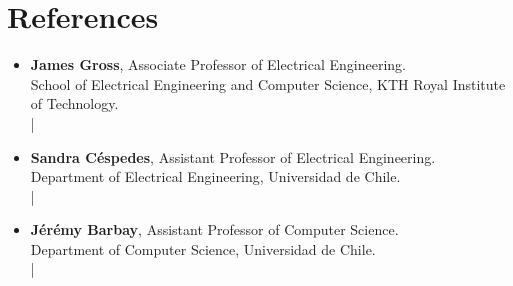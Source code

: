 \documentclass[letterpaper,11pt]{article}
\begin{document}
\section{References}
\begin{itemize}[leftmargin=*]
  \item \textbf{James Gross}, Associate Professor of Electrical Engineering.\\
  School of Electrical Engineering and Computer Science, KTH Royal Institute of Technology.\\
   | \\

  \item \textbf{Sandra Céspedes}, Assistant Professor of Electrical Engineering.\\
  Department of Electrical Engineering, Universidad de Chile.\\
   | \\

  \item \textbf{Jérémy Barbay}, Assistant Professor of Computer Science.\\
  Department of Computer Science, Universidad de Chile.\\
   | \\
\end{itemize}

%


\end{document}
